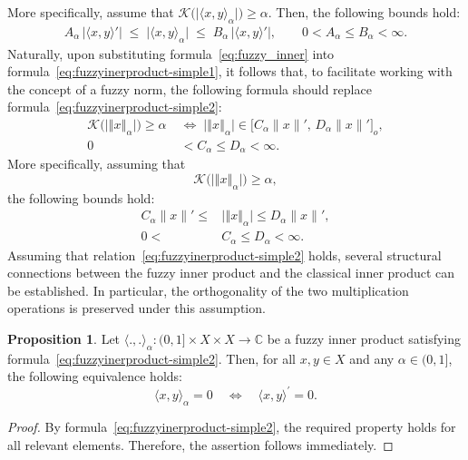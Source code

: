 \documentclass[preprint,12pt]{elsarticle}
\newcommand{\norm}[1]{\left\Vert#1\right\Vert}
\theoremstyle{definition}
\newtheorem{proposition}{Proposition}[section]
\begin{document}
More specifically, assume that 
\(
\mathcal{K}\big(\big|\langle x, y \rangle_\alpha\big|\big) \ge \alpha.
\)
Then, the following bounds hold:
\begin{equation}\label{eq:fuzzyinerproduct-simple2}
	\begin{split}
		A_{\alpha}\,|\langle x,y\rangle'|
		\;\le\; \big|\langle x, y \rangle_\alpha\big|
		\;\le\; B_{\alpha}\,|\langle x,y\rangle'|, 
		\qquad
		0 < A_\alpha \le B_\alpha < \infty .
	\end{split}
\end{equation}
Naturally, upon substituting formula~\eqref{eq:fuzzy_inner} into formula~\eqref{eq:fuzzyinerproduct-simple1}, it follows that, to facilitate working with the concept of a fuzzy norm, the following formula should replace formula~\eqref{eq:fuzzyinerproduct-simple2}:
\begin{equation}\label{eq:fuzzynorm-simple1}
	\begin{split}
		\mathcal{K}\bigl(\big\vert \norm{x}_\alpha\big\vert\bigr) \geq \alpha
		\;&\Leftrightarrow\;
		\big| \norm{x}_\alpha \big| \in 
		\big[ C_\alpha\|x\|',\, D_\alpha\|x\|' \big]_o,\\
		0&<C_\alpha\leq D_\alpha<\infty.		
	\end{split}
\end{equation}
More specifically, assuming that 
\[
\mathcal{K}\bigl(\big| \norm{x}_\alpha \big|\bigr) \geq \alpha,
\] 
the following bounds hold:
\begin{equation}\label{eq:fuzzynorm-simple2}
	\begin{split}
		C_\alpha\|x\|'\leq &\big| \norm{x}_\alpha \big|\leq  D_\alpha\|x\|',\\
		0<&C_\alpha\leq D_\alpha<\infty.
	\end{split}
\end{equation}
Assuming that relation~\eqref{eq:fuzzyinerproduct-simple2} holds, several structural connections between the fuzzy inner product and the classical inner product can be established. In particular, the orthogonality of the two multiplication operations is preserved under this assumption.

\begin{proposition}
	Let $	\langle  ., . \rangle_\alpha :(0,1]\times X\times X\to \mathbb{C}$ be a fuzzy inner product satisfying formula~\eqref{eq:fuzzyinerproduct-simple2}. Then, for all $x, y \in X$ and any $\alpha \in (0,1]$, the following equivalence holds:
	\[
		\langle  x, y \rangle_\alpha  = 0 \quad \Longleftrightarrow \quad \langle x, y \rangle^\prime = 0.
	\]
	\begin{proof}
		By formula~\eqref{eq:fuzzyinerproduct-simple2}, the required property holds for all relevant elements. Therefore, the assertion follows immediately.
	\end{proof}
	
\end{proposition}
\end{document}
